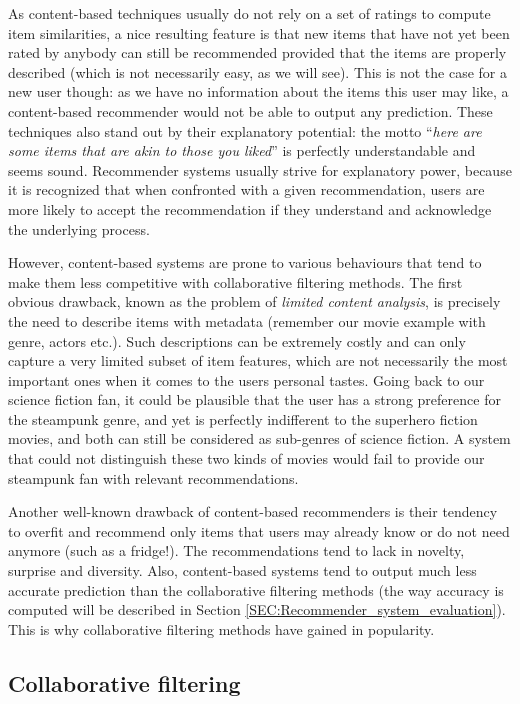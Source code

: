 As content-based techniques usually do not rely on a set of ratings to compute item
similarities, a nice resulting feature is that new items that have not yet been
rated by anybody can still be recommended provided that the items are properly
described (which is not necessarily easy, as we will see). This is not the case for a new user
though: as we have no information about the items this user may like, a
content-based recommender would not be able to output any prediction. These
techniques also stand out by their explanatory potential: the motto
``\textit{here are some items that are akin to those you liked}'' is perfectly
understandable and seems sound.  Recommender systems usually strive for
explanatory power, because it is recognized that when confronted with a given
recommendation, users are more likely to accept the recommendation if they
understand and acknowledge the underlying process.

However, content-based systems are prone to various behaviours that tend to make
them less competitive with collaborative filtering methods. The first obvious drawback, known as
the problem of \textit{limited content analysis}, is precisely the need to
describe items with metadata (remember our movie example with
genre, actors etc.). Such descriptions can be extremely costly and can only
capture a very limited subset of item features, which are not necessarily the
most important ones when it comes to the users personal tastes. Going back to
our science fiction fan, it could be plausible that the user has a strong
preference for the steampunk genre, and yet is perfectly indifferent to the
superhero fiction movies, and both can still be considered as sub-genres of
science fiction. A system that could not distinguish these two kinds of movies
would fail to provide our steampunk fan with relevant recommendations.

Another well-known drawback of content-based recommenders is their tendency to
overfit and recommend only items that users may already know or do not need
anymore (such as a fridge!). The recommendations tend to lack in novelty,
surprise and diversity. Also, content-based systems tend to output much less
accurate prediction than the collaborative filtering methods (the way accuracy
is computed will be described in Section
\ref{SEC:Recommender_system_evaluation}). This is why collaborative filtering
methods have gained in popularity.

\subsection{Collaborative filtering}


